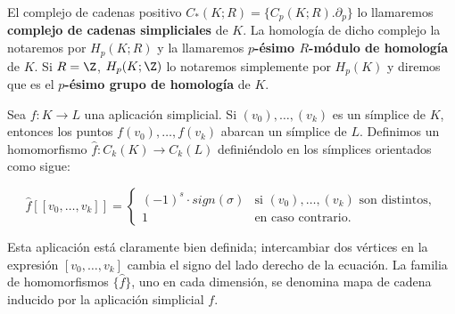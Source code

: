 \begin{definicion}
	El complejo de cadenas positivo $C_*(K;R) = \{C_p(K;R). \partial_p\}$ lo llamaremos \textbf{complejo de cadenas simpliciales} de $K$. La homología de dicho complejo la notaremos por $H_p(K;R)$ y la llamaremos \textbf{$p$-ésimo $R$-módulo de homología} de $K$. Si $R=\Z$, $H_p(K;\Z)$ lo notaremos simplemente por $H_p(K)$ y diremos que es el \textbf{$p$-ésimo grupo de homología} de $K$.
\end{definicion}

\begin{definicion}
	Sea $f: K \rightarrow L$ una aplicación simplicial. Si $(v_0), \ldots, (v_k)$ es un símplice de $K$, entonces los puntos $f(v_0), \ldots, f(v_k)$ abarcan un símplice de $L$. Definimos un homomorfismo $\hat{f}: C_k(K) \rightarrow C_k(L)$ definiéndolo en los símplices orientados como sigue:
	
	$$\hat{f} [[v_0, \ldots, v_k]] =
	\begin{cases}
		(-1)^s \cdot sign(\sigma) & \text{si }(v_0), \ldots, (v_k) \text{ son distintos}, \\
		1 & \text{en caso contrario}.
	\end{cases}$$
\end{definicion}

Esta aplicación está claramente bien definida; intercambiar dos vértices en la expresión $[v_0, \ldots, v_k]$ cambia el signo del lado derecho de la ecuación. La familia de homomorfismos $\{\hat{f}\}$, uno en cada dimensión, se denomina mapa de cadena inducido por la aplicación simplicial $f$.

